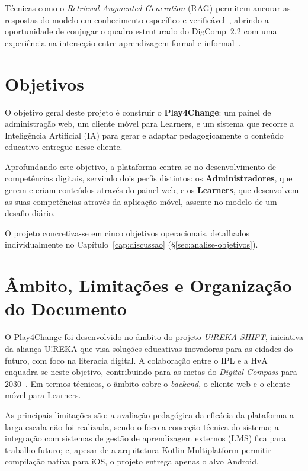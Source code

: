 Técnicas como o \textit{Retrieval-Augmented Generation} (RAG) permitem ancorar as respostas do modelo em conhecimento específico e verificável~\cite{lewis2020}, abrindo a oportunidade de conjugar o quadro estruturado do DigComp~2.2 com uma experiência na interseção entre aprendizagem formal e informal~\cite{cross2007}.

\section{Objetivos} \label{sec:objetivos}

O objetivo geral deste projeto é construir o \textbf{Play4Change}: um painel de administração web, um cliente móvel para Learners, e um sistema que recorre a Inteligência Artificial (IA) para gerar e adaptar pedagogicamente o conteúdo educativo entregue nesse cliente.

Aprofundando este objetivo, a plataforma centra-se no desenvolvimento de competências digitais, servindo dois perfis distintos: os \textbf{Administradores}, que gerem e criam conteúdos através do painel web, e os \textbf{Learners}, que desenvolvem as suas competências através da aplicação móvel, assente no modelo de um desafio diário.

O projeto concretiza-se em cinco objetivos operacionais, detalhados individualmente no Capítulo~\ref{cap:discussao} (§\ref{sec:analise-objetivos}).

\section{Âmbito, Limitações e Organização do Documento} \label{sec:ambito}

O Play4Change foi desenvolvido no âmbito do projeto \textit{U!REKA SHIFT}, iniciativa da aliança U!REKA que visa soluções educativas inovadoras para as cidades do futuro, com foco na literacia digital. A colaboração entre o IPL e a HvA enquadra-se neste objetivo, contribuindo para as metas do \textit{Digital Compass} para 2030~\cite{digitaldecade2022}. Em termos técnicos, o âmbito cobre o \textit{backend}, o cliente web e o cliente móvel para Learners.

As principais limitações são: a avaliação pedagógica da eficácia da plataforma a larga escala não foi realizada, sendo o foco a conceção técnica do sistema; a integração com sistemas de gestão de aprendizagem externos (LMS) fica para trabalho futuro; e, apesar de a arquitetura Kotlin Multiplatform permitir compilação nativa para iOS, o projeto entrega apenas o alvo Android.

